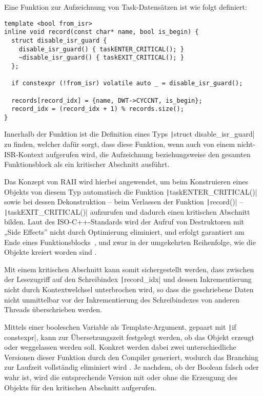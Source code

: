 Eine Funktion zur Aufzeichnung von Task-Datensätzen ist wie folgt definiert:

\begin{code}
\begin{verbatim}
template <bool from_isr>
inline void record(const char* name, bool is_begin) {
  struct disable_isr_guard {
    disable_isr_guard() { taskENTER_CRITICAL(); }
    ~disable_isr_guard() { taskEXIT_CRITICAL(); }
  };

  if constexpr (!from_isr) volatile auto _ = disable_isr_guard();

  records[record_idx] = {name, DWT->CYCCNT, is_begin};
  record_idx = (record_idx + 1) % records.size();
}
\end{verbatim}
\end{code}

Innerhalb der Funktion ist die Definition eines Typs \texttt|struct
disable_isr_guard| zu finden, welcher dafür sorgt, dass diese Funktion, wenn
auch von einem nicht-ISR-Kontext aufgerufen wird, die Aufzeichnung
beziehungsweise den gesamten Funktionsblock als ein kritischer Abschnitt
ausführt.

Das Konzept von \ac{RAII} wird hierbei angewendet, um beim Konstruieren eines
Objekts von diesem Typ automatisch die Funktion
\texttt|taskENTER_CRITICAL()| sowie bei dessen Dekonstruktion – beim
Verlassen der Funktion \texttt|record()| –
\texttt|taskEXIT_CRITICAL()| aufzurufen und dadurch einen kritischen
Abschnitt bilden. Laut des ISO-C++-Standards wird der Aufruf von Destruktoren
mit „Side Effects” nicht durch Optimierung eliminiert, und erfolgt garantiert am
Ende eines Funktionsblocks~\cite[§ 6.7.5.4 Abs. 3]{iso_iec_14882_2020}, und zwar
in der umgekehrten Reihenfolge, wie die Objekte kreiert worden sind
\cite{isocpp_dtor_order}.

Mit einem kritischen Abschnitt kann somit sichergestellt werden, dass zwischen
der Lesezugriff auf den Schreibindex \texttt|record_idx| und dessen
Inkrementierung nicht durch Kontextwelchsel unterbrochen wird, so dass die
geschriebene Daten nicht unmittelbar vor der Inkrementierung des Schreibindexes
von anderen Threads überschrieben werden.

Mittels einer booleschen Variable als Template-Argument, gepaart mit
\texttt|if constexpr|, kann zur Übersetzungszeit festgelegt werden, ob
das Objekt erzeugt oder weggelassen werden soll. Konkret werden dabei zwei
unterschiedliche Versionen dieser Funktion durch den Compiler generiert, wodurch
das Branching zur Laufzeit vollständig eliminiert wird
\cite{cppreference_constexpr_if}. Je nachdem, ob der Boolean falsch oder wahr
ist, wird die entsprechende Version mit oder ohne die Erzeugung des Objekts für
den kritischen Abschnitt aufgerufen.


